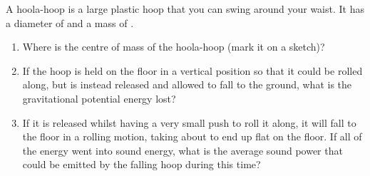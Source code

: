 
\begin{problem}[Robin7]
{A hoola-hoop is a large plastic hoop that you can swing around your waist.  It has a diameter of  and a mass of .
\begin{enumerate}
	\item Where is the centre of mass of the hoola-hoop (mark it on a sketch)?
	\item If the hoop is held on the floor in a vertical position so that it could be rolled along, but is instead released and allowed to fall to the ground, what is the gravitational potential energy lost?
	\item If it is released whilst having a very small push to roll it along, it will fall to the floor in a rolling motion, taking about  to end up flat on the floor. If all of the energy went into sound energy, what is the average sound power that could be emitted by the falling hoop during this time?
\end{enumerate}
}
{}
{}
\end{problem}